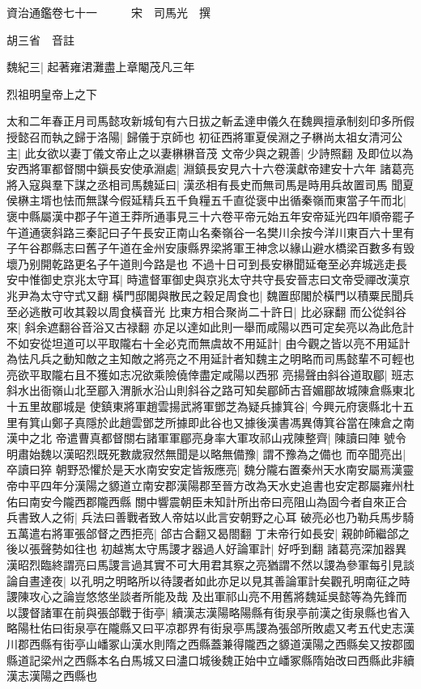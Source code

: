 資治通鑑卷七十一　　　宋　司馬光　撰

胡三省　音註

魏紀三|{
	起著雍涒灘盡上章閹茂凡三年}


烈祖明皇帝上之下

太和二年春正月司馬懿攻新城旬有六日拔之斬孟達申儀久在魏興擅承制刻印多所假授懿召而執之歸于洛陽|{
	歸儀于京師也}
初征西將軍夏侯淵之子楙尚太祖女清河公主|{
	此女欲以妻丁儀文帝止之以妻楙楙音茂}
文帝少與之親善|{
	少詩照翻}
及即位以為安西將軍都督關中鎭長安使承淵處|{
	淵鎮長安見六十六卷漢獻帝建安十六年}
諸葛亮將入寇與羣下謀之丞相司馬魏延曰|{
	漢丞相有長史而無司馬是時用兵故置司馬}
聞夏侯楙主壻也怯而無謀今假延精兵五千負糧五千直從褒中出循秦嶺而東當子午而北|{
	褒中縣屬漢中郡子午道王莽所通事見三十六卷平帝元始五年安帝延光四年順帝罷子午道通褒斜路三秦記曰子午長安正南山名秦嶺谷一名樊川余按今洋川東百六十里有子午谷郡縣志曰舊子午道在金州安康縣界梁將軍王神念以緣山避水橋梁百數多有毁壞乃别開乾路更名子午道則今路是也}
不過十日可到長安楙聞延奄至必弃城逃走長安中惟御史京兆太守耳|{
	時遣督軍御史與京兆太守共守長安晉志曰文帝受禪改漢京兆尹為太守守式又翻}
橫門邸閣與散民之穀足周食也|{
	魏置邸閣於橫門以積粟民聞兵至必逃散可收其穀以周食橫音光}
比東方相合聚尚二十許日|{
	比必寐翻}
而公從斜谷來|{
	斜余遮翻谷音浴又古禄翻}
亦足以達如此則一舉而咸陽以西可定矣亮以為此危計不如安從坦道可以平取隴右十全必克而無虞故不用延計|{
	由今觀之皆以亮不用延計為怯凡兵之動知敵之主知敵之將亮之不用延計者知魏主之明略而司馬懿輩不可輕也亮欲平取隴右且不獲如志况欲乘險僥倖盡定咸陽以西邪}
亮揚聲由斜谷道取郿|{
	班志斜水出衙嶺山北至郿入渭脈水沿山則斜谷之路可知矣郿師古音媚郿故城陳倉縣東北十五里故郿城是}
使鎮東將軍趙雲揚武將軍鄧芝為疑兵據箕谷|{
	今興元府褒縣北十五里有箕山鄭子真隱於此趙雲鄧芝所據即此谷也又據後漢書馮異傳箕谷當在陳倉之南漢中之北}
帝遣曹真都督關右諸軍軍郿亮身率大軍攻祁山戎陳整齊|{
	陳讀曰陣}
號令明肅始魏以漢昭烈既死數歲寂然無聞是以略無備豫|{
	謂不豫為之備也}
而卒聞亮出|{
	卒讀曰猝}
朝野恐懼於是天水南安安定皆叛應亮|{
	魏分隴右置秦州天水南安屬焉漢靈帝中平四年分漢陽之䝠道立南安郡漢陽郡至晉方改為天水史追書也安定郡屬雍州杜佑曰南安今隴西郡隴西縣}
關中響震朝臣未知計所出帝曰亮阻山為固今者自來正合兵書致人之術|{
	兵法曰善戰者致人帝姑以此言安朝野之心耳}
破亮必也乃勒兵馬步騎五萬遣右將軍張郃督之西拒亮|{
	郃古合翻又曷閤翻}
丁未帝行如長安|{
	親帥師繼郃之後以張聲勢如往也}
初越嶲太守馬謖才器過人好論軍計|{
	好呼到翻}
諸葛亮深加器異漢昭烈臨終謂亮曰馬謖言過其實不可大用君其察之亮猶謂不然以謖為參軍每引見談論自晝達夜|{
	以孔明之明略所以待謖者如此亦足以見其善論軍計矣觀孔明南征之時謖陳攻心之論豈悠悠坐談者所能及哉}
及出軍祁山亮不用舊將魏延吳懿等為先鋒而以謖督諸軍在前與張郃戰于街亭|{
	續漢志漢陽略陽縣有街泉亭前漢之街泉縣也省入略陽杜佑曰街泉亭在隴縣又曰平凉郡界有街泉亭馬謖為張郃所敗處又考五代史志漢川郡西縣有街亭山嶓冢山漢水則隋之西縣蓋兼得隴西之䝠道漢陽之西縣矣又按郡國縣道記梁州之西縣本名白馬城又曰濜口城後魏正始中立嶓冢縣隋始改曰西縣此非續漢志漢陽之西縣也}
